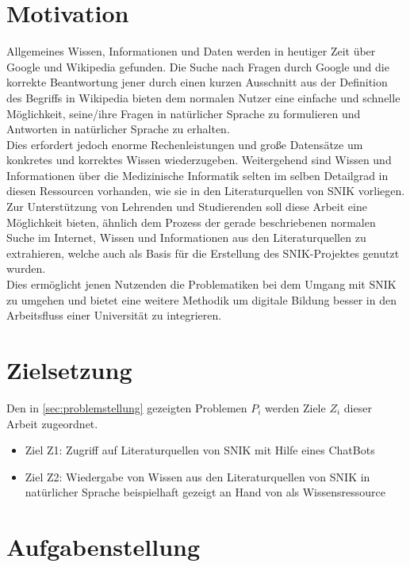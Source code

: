 \section{Motivation}

Allgemeines Wissen, Informationen und Daten werden in heutiger Zeit über Google und Wikipedia gefunden. 
Die Suche nach Fragen durch Google und die korrekte Beantwortung jener durch einen kurzen Ausschnitt aus der Definition des Begriffs in Wikipedia bieten dem normalen Nutzer eine einfache und schnelle Möglichkeit, seine/ihre Fragen in natürlicher Sprache zu formulieren und Antworten in natürlicher Sprache zu erhalten.\\

Dies erfordert jedoch enorme Rechenleistungen und große Datensätze um konkretes und korrektes Wissen wiederzugeben. 
Weitergehend sind Wissen und Informationen über die Medizinische Informatik selten im selben Detailgrad in diesen Ressourcen vorhanden, wie sie in den Literaturquellen von SNIK vorliegen. 
Zur Unterstützung von Lehrenden und Studierenden soll diese Arbeit eine Möglichkeit bieten, ähnlich dem Prozess der gerade beschriebenen normalen Suche im Internet, Wissen und Informationen aus den Literaturquellen zu extrahieren, welche auch als Basis für die Erstellung des SNIK-Projektes genutzt wurden.\\

Dies ermöglicht jenen Nutzenden die Problematiken bei dem Umgang mit SNIK zu umgehen und bietet eine weitere Methodik um digitale Bildung besser in den Arbeitsfluss einer Universität zu integrieren.

\section{Zielsetzung}\label{sec:zielsetzung}

Den in \ref{sec:problemstellung} gezeigten Problemen $P_i$ werden Ziele $Z_i$ dieser Arbeit zugeordnet.

\begin{itemize}
  \item Ziel Z1: Zugriff auf Literaturquellen von SNIK mit Hilfe eines ChatBots
  \item Ziel Z2: Wiedergabe von Wissen aus den Literaturquellen von SNIK in natürlicher Sprache beispielhaft gezeigt an Hand von \citet{bb} als Wissensressource
\end{itemize}

\section{Aufgabenstellung}

